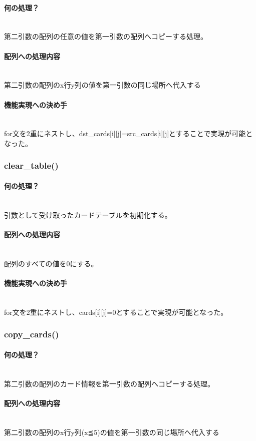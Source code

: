 \documentclass[11pt,a4paper, uplatex]{jsarticle}
\begin{document}
\paragraph{何の処理？}\mbox{}\\
第二引数の配列の任意の値を第一引数の配列へコピーする処理。
\paragraph{配列への処理内容}\mbox{}\\
第二引数の配列のx行y列の値を第一引数の同じ場所へ代入する
\paragraph{機能実現への決め手}\mbox{}\\
for文を2重にネストし、dst\_cards[i][j]=src\_cards[i][j]とすることで実現が可能となった。
%
\subsubsection{clear\_table()}
\paragraph{何の処理？}\mbox{}\\
引数として受け取ったカードテーブルを初期化する。
\paragraph{配列への処理内容}\mbox{}\\
配列のすべての値を0にする。
\paragraph{機能実現への決め手}\mbox{}\\
for文を2重にネストし、cards[i][j]=0とすることで実現が可能となった。
%
\subsubsection{copy\_cards()}
\paragraph{何の処理？}\mbox{}\\
第二引数の配列のカード情報を第一引数の配列へコピーする処理。
\paragraph{配列への処理内容}\mbox{}\\
第二引数の配列のx行y列(x≦5)の値を第一引数の同じ場所へ代入する
\end{document}
